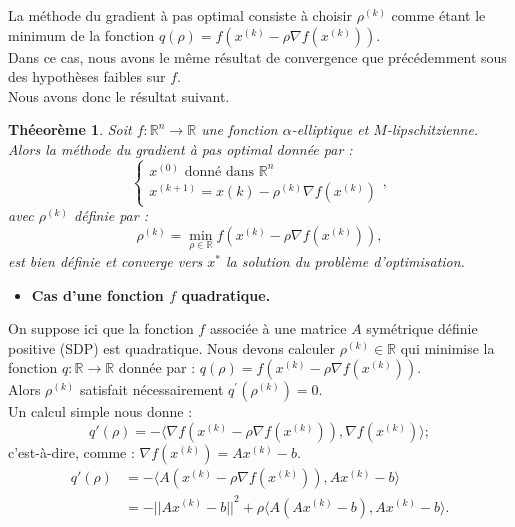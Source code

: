 \documentclass[12pt,a4paper,openay]{book}
\numberwithin{equation}{chapter}
\newtheorem{theo}{Th\'eeor\`eme}[chapter]
\newcommand{\al}{\alpha}
\newcommand{\R}{\mathbb{R}}
\begin{document}
		La m\'ethode du gradient \`a pas optimal consiste \`a choisir $\rho^{(k)}$ comme \'etant le minimum de la fonction $q(\rho) = f\left(x^{(k)} - \rho\nabla f\left(x^{(k)}\right) \right)$.\\		
		Dans ce cas, nous avons le m\^eme r\'esultat de convergence que pr\'ec\'edemment sous des hypoth\`eses faibles sur $f$.\\		
		Nous avons donc le r\'esultat suivant.
		\begin{theo}
			Soit $f:\R^{n} \to \R$ une fonction $\al$-elliptique et $M$-lipschitzienne.\\
			Alors la m\'ethode du gradient \`a pas optimal donn\'ee par :
			$$\begin{cases}
				x^{(0)} \text{ donn\'e dans } \R^{n}\\
				x^{(k+1)} = x{(k)} - \rho^{(k)} \nabla f \left(x^{(k)}\right)  
			\end{cases},$$
			avec $\rho^{(k)}$ d\'efinie par :
			$$
			\rho^{(k)} = 	\min_{\rho \in \R}f\left(x^{(k)} - \rho\nabla f\left(x^{(k)}\right)\right), 
			$$
		est bien d\'efinie et converge vers $x^{*}$ la solution du probl\`eme d'optimisation.\\			
		\end{theo} 
	\begin{itemize}
		\item[$\bullet$] \textbf{\large Cas d'une fonction $f$ quadratique.} 
	\end{itemize}
	On suppose ici que la fonction $f$ associ\'ee \`a une matrice $A$ sym\'etrique d\'efinie positive (SDP) est quadratique.
	Nous devons calculer $\rho^{(k)}\in\R$ qui minimise la fonction $q:\R\to\R$ donn\'ee par :
	 $q(\rho) = f\left(x^{(k)} - \rho\nabla f\left(x^{(k)}\right) \right)$.\\
	 Alors $\rho^{(k)}$ satisfait n\'ecessairement $ q^{\prime}\left(\rho^{(k)} \right) = 0$.\\
	 Un calcul simple nous donne :
	 $$q'(\rho) = -\langle\nabla f\left(x^{(k)} - \rho\nabla f\left(x^{(k)}\right) \right), \nabla f\left(x^{(k)}\right)\rangle ;$$
	 c'est-\`a-dire, comme : $ \nabla f\left(x^{(k)}\right) = Ax^{(k)} - b.$\\
	$$\begin{aligned}
		 q'(\rho)& = -\langle A\left(x^{(k)} - \rho\nabla f\left(x^{(k)}\right) \right), Ax^{(k)} - b \rangle\\
		         & = - {||Ax^{(k)} - b||}^2 + \rho \langle A\left( Ax^{(k)} - b\right),  Ax^{(k)} - b\rangle .
	\end{aligned}$$
\end{document}
